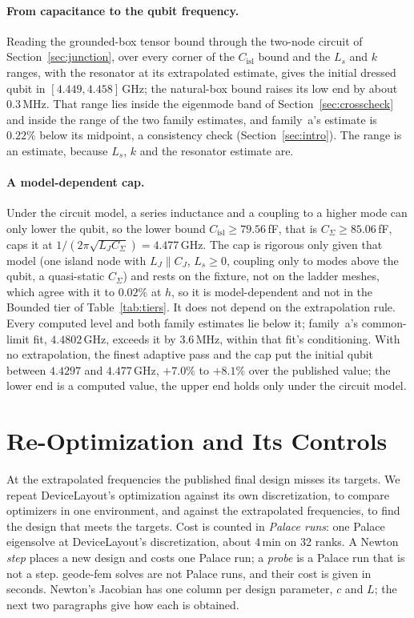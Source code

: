 \documentclass{anvil-paper}
\newcommand{\Cisl}{C_{\mathrm{isl}}}
\begin{document}
\paragraph{From capacitance to the qubit frequency.}
Reading the grounded-box tensor bound through the two-node circuit of
Section~\ref{sec:junction}, over every corner of the $\Cisl$ bound and the
$L_s$ and $k$ ranges, with the resonator at its extrapolated estimate, gives the
initial dressed qubit in $[4.449, 4.458]$\,GHz; the natural-box bound raises
its low end by about $0.3$\,MHz. That range lies inside the eigenmode band of
Section~\ref{sec:crosscheck} and inside the range of the two family
estimates, and family~a's estimate is $0.22\%$ below its midpoint, a
consistency check (Section~\ref{sec:intro}). The range is an estimate, because $L_s$, $k$
and the resonator estimate are.

\paragraph{A model-dependent cap.}
Under the circuit model, a series inductance and a coupling to a higher
mode can only lower the qubit, so the lower bound $\Cisl \ge 79.56$\,fF,
that is $C_\Sigma \ge 85.06$\,fF, caps it at $1/(2\pi\sqrt{L_J C_\Sigma})
= 4.477$\,GHz. The cap is rigorous only given that model (one island node
with $L_J \parallel C_J$, $L_s \ge 0$, coupling only to modes above the
qubit, a quasi-static $C_\Sigma$) and rests on the fixture, not on the
ladder meshes, which agree with it to $0.02\%$ at $h$, so it is
model-dependent and not in the Bounded tier of Table~\ref{tab:tiers}. It
does not depend on the
extrapolation rule. Every computed level and both family estimates lie
below it; family~a's common-limit fit, $4.4802$\,GHz, exceeds it by
$3.6$\,MHz, within that fit's conditioning. With no extrapolation, the finest adaptive pass and the cap put the initial qubit between $4.4297$ and
$4.477$\,GHz, $+7.0\%$ to $+8.1\%$ over the published value; the lower end is a computed value, the upper end holds only under the circuit model.

\section{Re-Optimization and Its Controls}
\label{sec:reopt}

At the extrapolated frequencies the published final design misses its
targets. We repeat DeviceLayout's optimization against its own
discretization, to compare optimizers in one environment, and against the
extrapolated frequencies, to find the design that meets the targets.
Cost is counted in \emph{Palace runs}: one Palace eigensolve at
DeviceLayout's discretization, about $4$\,min on 32 ranks. A Newton
\emph{step} places a new design and costs one Palace run; a \emph{probe}
is a Palace run that is not a step. geode-fem solves are not Palace runs,
and their cost is given in seconds. Newton's Jacobian has one column per
design parameter, $c$ and $L$; the next two paragraphs give how each is
obtained.
\end{document}
